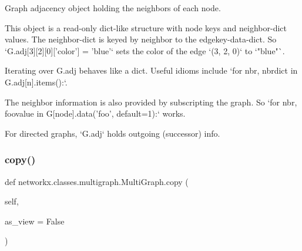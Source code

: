 \begin{DoxyVerb}Graph adjacency object holding the neighbors of each node.

This object is a read-only dict-like structure with node keys
and neighbor-dict values.  The neighbor-dict is keyed by neighbor
to the edgekey-data-dict.  So `G.adj[3][2][0]['color'] = 'blue'` sets
the color of the edge `(3, 2, 0)` to `"blue"`.

Iterating over G.adj behaves like a dict. Useful idioms include
`for nbr, nbrdict in G.adj[n].items():`.

The neighbor information is also provided by subscripting the graph.
So `for nbr, foovalue in G[node].data('foo', default=1):` works.

For directed graphs, `G.adj` holds outgoing (successor) info.
\end{DoxyVerb}
 \mbox{\label{classnetworkx_1_1classes_1_1multigraph_1_1MultiGraph_ab39351b96b86b8717820cec0c7f72400}} 
\subsubsection{\texorpdfstring{copy()}{copy()}}
{\footnotesize\ttfamily def networkx.\+classes.\+multigraph.\+Multi\+Graph.\+copy (\begin{DoxyParamCaption}\item[{}]{self,  }\item[{}]{as\+\_\+view = {\ttfamily False} }\end{DoxyParamCaption})}

